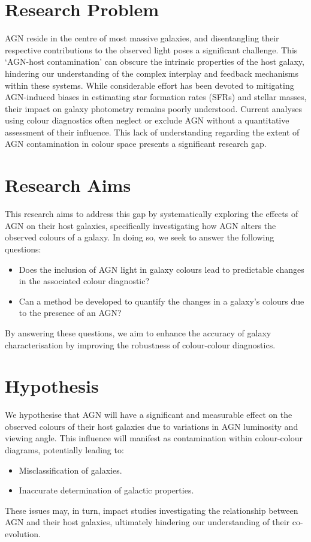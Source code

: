\section{Research Problem}
AGN reside in the centre of most massive galaxies, and disentangling their respective contributions to the observed light poses a significant challenge. This `AGN-host contamination' can obscure the intrinsic properties of the host galaxy, hindering our understanding of the complex interplay and feedback mechanisms within these systems. While considerable effort has been devoted to mitigating AGN-induced biases in estimating star formation rates (SFRs) and stellar masses, their impact on galaxy photometry remains poorly understood. Current analyses using colour diagnostics often neglect or exclude AGN without a quantitative assessment of their influence. This lack of understanding regarding the extent of AGN contamination in colour space presents a significant research gap.
\section{Research Aims}
This research aims to address this gap by systematically exploring the effects of AGN on their host galaxies, specifically investigating how AGN alters the observed colours of a galaxy. In doing so, we seek to answer the following questions:
\begin{itemize}
\item Does the inclusion of AGN light in galaxy colours lead to predictable changes in the associated colour diagnostic?
\item Can a method be developed to quantify the changes in a galaxy's colours due to the presence of an AGN?
\end{itemize}
By answering these questions, we aim to enhance the accuracy of galaxy characterisation by improving the robustness of colour-colour diagnostics.
\section{Hypothesis}
We hypothesise that AGN will have a significant and measurable effect on the observed colours of their host galaxies due to variations in AGN luminosity and viewing angle. This influence will manifest as contamination within colour-colour diagrams, potentially leading to:
\begin{itemize}
\item Misclassification of galaxies.
\item Inaccurate determination of galactic properties.
\end{itemize}
These issues may, in turn, impact studies investigating the relationship between AGN and their host galaxies, ultimately hindering our understanding of their co-evolution.